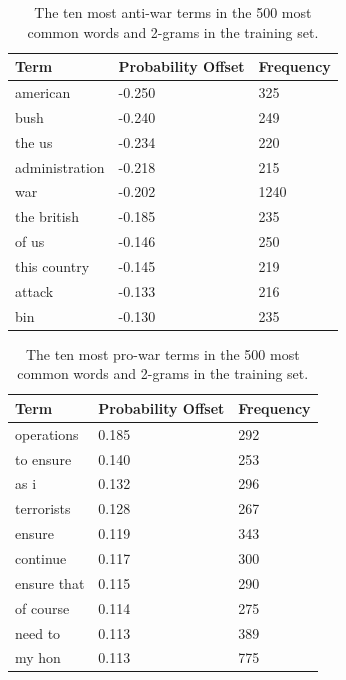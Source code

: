 \documentclass[12pt,a4paper,twoside,openright]{report}
\begin{document}
\begin{table}[]
	\centering
	\begin{tabular}{lll}
		\hline
		\textbf{Term}  & \textbf{Probability Offset} & \textbf{Frequency} \\ \hline
		american       & -0.250                      & 325                \\
		bush           & -0.240                      & 249                \\
		the us         & -0.234                      & 220                \\
		administration & -0.218                      & 215                \\
		war            & -0.202                      & 1240               \\
		the british    & -0.185                      & 235                \\
		of us          & -0.146                      & 250                \\
		this country   & -0.145                      & 219                \\
		attack         & -0.133                      & 216                \\
		bin            & -0.130                      & 235                \\ \hline
	\end{tabular}
	\caption{The ten most anti-war terms in the 500 most common words and 2-grams in the training set.}
	\label{table:anti-grams}
\end{table}
\begin{table}[]
	\centering
	\begin{tabular}{lll}
		\hline
		\textbf{Term} & \textbf{Probability Offset} & \textbf{Frequency} \\ \hline
		operations    & 0.185                       & 292                \\
		to ensure     & 0.140                       & 253                \\
		as i          & 0.132                       & 296                \\
		terrorists    & 0.128                       & 267                \\
		ensure        & 0.119                       & 343                \\
		continue      & 0.117                       & 300                \\
		ensure that   & 0.115                       & 290                \\
		of course     & 0.114                       & 275                \\
		need to       & 0.113                       & 389                \\
		my hon        & 0.113                       & 775                \\ \hline
	\end{tabular}
	\caption{The ten most pro-war terms in the 500 most common words and 2-grams in the training set.}
	\label{table:pro-grams}	
\end{table}
\end{document}
